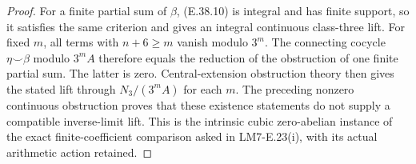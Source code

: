\begin{proof}
For a finite partial sum of $\beta$,
(E.38.10) is integral and has finite
support, so it satisfies the same
criterion and gives an integral
continuous class-three lift. For
fixed $m$, all terms with $n+6\ge m$
vanish modulo $3^m$. The connecting
cocycle $\eta\smile\beta$ modulo
$3^mA$ therefore equals the reduction
of the obstruction of one finite
partial sum. The latter is zero.
Central-extension obstruction theory
then gives the stated lift through
$N_3/(3^mA)$ for each $m$.
The preceding nonzero continuous
obstruction proves that these
existence statements do not supply
a compatible inverse-limit lift.
This is the intrinsic cubic
zero-abelian instance of the exact
finite-coefficient comparison asked
in LM7-E.23(i), with its actual
arithmetic action retained.
\end{proof}
